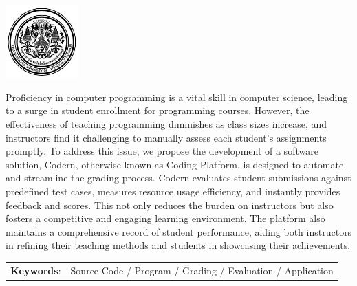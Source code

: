 \documentclass[12pt,oneside,openright,a4paper]{cpe-thai-project}
\begin{document}
\pdfstringdefDisableCommands{%
\let\MakeUppercase\relax
}

\begin{center}
  \includegraphics[width=2.8cm]{./figure/kmutt.jpg}
\end{center}
\vspace*{-1cm}

\maketitlepage
\makesignaturepage 

\abstract
Proficiency in computer programming is a vital skill in computer science, leading to a surge in student enrollment for programming courses. However, the effectiveness of teaching programming diminishes as class sizes increase, and instructors find it challenging to manually assess each student's assignments promptly. To address this issue, we propose the development of a software solution, Codern, otherwise known as Coding Platform, is designed to automate and streamline the grading process. Codern evaluates student submissions against predefined test cases, measures resource usage efficiency, and instantly provides feedback and scores. This not only reduces the burden on instructors but also fosters a competitive and engaging learning environment. The platform also maintains a comprehensive record of student performance, aiding both instructors in refining their teaching methods and students in showcasing their achievements.

\begin{flushleft}
\begin{tabular*}{\textwidth}{@{}lp{}}
\textbf{Keywords}: & Source Code / Program / Grading / Evaluation / Application
\end{tabular*}
\end{flushleft}
\endabstract
\end{document}
